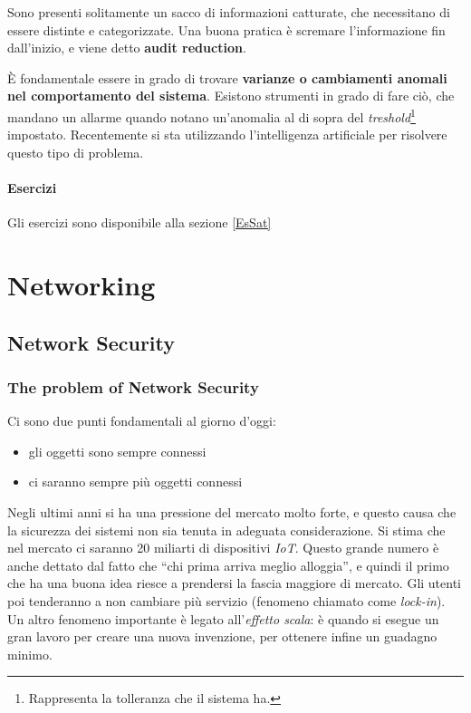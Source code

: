 Sono presenti solitamente un sacco di informazioni catturate, che necessitano 
di essere distinte e categorizzate.
Una buona pratica è scremare l'informazione fin dall'inizio, e viene detto 
\textbf{audit reduction}.

È fondamentale essere in grado di trovare \textbf{varianze o cambiamenti 
anomali nel comportamento del sistema}. Esistono strumenti in grado di fare 
ciò, che mandano un allarme quando notano un'anomalia al di sopra del 
\textit{treshold}\footnote{Rappresenta la tolleranza che il sistema ha.} 
impostato. Recentemente si sta utilizzando l'intelligenza artificiale per 
risolvere questo tipo di problema.

\subsection{Esercizi}

Gli esercizi sono disponibile alla sezione \ref{EsSat}


\part{Networking}

\chapter{Network Security}

\section{The problem of Network Security}

Ci sono due punti fondamentali al giorno d'oggi:

\begin{itemize}
\item gli oggetti sono sempre connessi
\item ci saranno sempre più oggetti connessi
\end{itemize}

Negli ultimi anni si ha una pressione del mercato molto forte, e questo causa 
che la sicurezza dei sistemi non sia tenuta in adeguata considerazione. Si 
stima che nel mercato ci saranno 20 miliarti di dispositivi \textit{IoT}. 
Questo grande numero è anche dettato dal fatto che ``chi prima arriva meglio 
alloggia'', e quindi il primo che ha una buona idea riesce a prendersi la 
fascia maggiore di mercato. Gli utenti poi tenderanno a non cambiare più 
servizio (fenomeno chiamato come \textit{lock-in}). Un altro fenomeno 
importante è legato all'\textit{effetto scala}: è quando si esegue un gran 
lavoro per creare una nuova invenzione, per ottenere infine un guadagno minimo.

